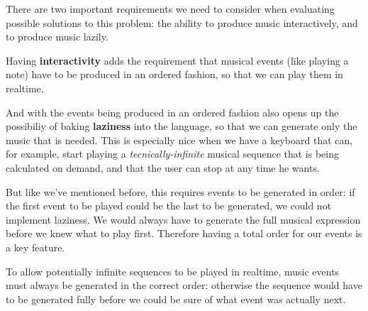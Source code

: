 \documentclass[a4paper,UKenglish,cleveref, autoref]{oasics-v2019}
\begin{document}
There are two important requirements we need to consider when evaluating possible solutions to this problem: the ability to produce music interactively, and to produce music lazily.

Having \textbf{interactivity} adds the requirement that musical events (like playing a note) have to be produced in an ordered fashion, so that we can play them in realtime.

And with the events being produced in an ordered fashion also opens up the possibiliy of baking \textbf{laziness} into the language, so that we can generate only the music that is needed. This is especially nice when we have a keyboard that can, for example, start playing a \textit{tecnically-infinite} musical sequence that is being calculated on demand, and that the user can stop at any time he wants.

But like we've mentioned before, this requires events to be generated in order: if the first event to be played could be the last to be generated, we could not implement laziness. We would always have to generate the full musical expression before we knew what to play first. Therefore having a total order for our events is a key feature.

\begin{claim}
\label{claim:total-order} To allow potentially infinite sequences to be played in realtime, music events must always be generated in the correct order: otherwise the sequence would have to be generated fully before we could be sure of what event was actually next.
\end{claim}
\end{document}
